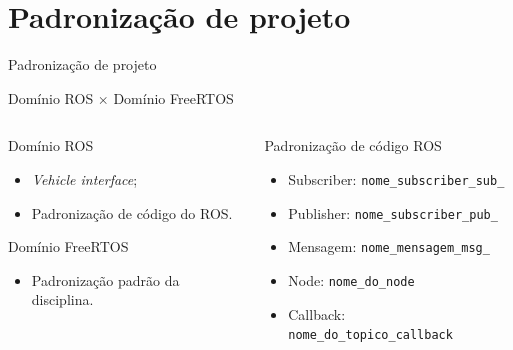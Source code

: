 \documentclass{if-beamer}
\begin{document}
\section{Padronização de projeto}

\begin{frame}{Padronização de projeto}
	
	\begin{block}{}
		\centering
		\vspace{1mm}
		Domínio ROS $\times$ Domínio FreeRTOS
		\vspace{1mm}
		
	\end{block}
	
	\begin{columns}
		
		\begin{column}{0.42\textwidth}
			
			\begin{block}{Domínio ROS}
				
				\begin{itemize}
					\item \textit{Vehicle interface};
					\item Padronização de código do ROS.
				\end{itemize}
				
			\end{block}
		
			\begin{block}{Domínio FreeRTOS}
			
				\begin{itemize}
					\item Padronização padrão da disciplina.
				\end{itemize}
			
			\end{block}
			
		\end{column}
		
		\begin{column}{0.45\textwidth}
			
			\begin{block}{Padronização de código ROS}
				
				\begin{itemize}
					\item Subscriber: \texttt{nome\_subscriber\_sub\_}
					\item Publisher: \texttt{nome\_subscriber\_pub\_}
					\item Mensagem: \texttt{nome\_mensagem\_msg\_}
					\item Node: \texttt{nome\_do\_node}
					\item Callback: \texttt{nome\_do\_topico\_callback}
					

\end{itemize}
\end{block}
\end{column}
\end{columns}
\end{frame}
\end{document}
